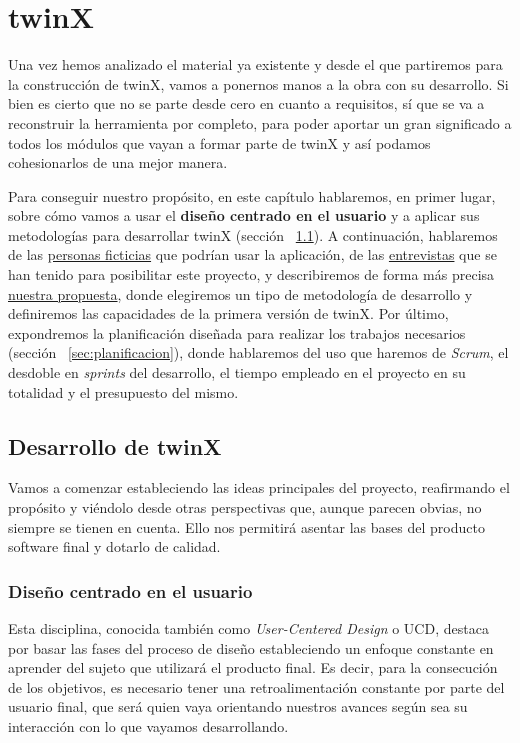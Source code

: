 \chapter{twinX}

Una vez hemos analizado el material ya existente y desde el que partiremos para la construcción de twinX, vamos a ponernos manos a la obra con su desarrollo. Si bien es cierto que no se parte desde cero en cuanto a requisitos, sí que se va a reconstruir la herramienta por completo, para poder aportar un gran significado a todos los módulos que vayan a formar parte de twinX y así podamos cohesionarlos de una mejor manera.
	
Para conseguir nuestro propósito, en este capítulo hablaremos, en primer lugar, sobre cómo vamos a usar el \textbf{diseño centrado en el usuario} y a aplicar sus metodologías para desarrollar twinX (sección ~\ref{sec:desarrollo}). A continuación, hablaremos de las \hyperref[sec:personas]{personas ficticias} que podrían usar la aplicación, de las \hyperref[sec:entrevistas]{entrevistas} que se han tenido para posibilitar este proyecto, y describiremos de forma más precisa \hyperref[sec:propuesta]{nuestra propuesta}, donde elegiremos un tipo de metodología de desarrollo y definiremos las capacidades de la primera versión de twinX. Por último, expondremos la planificación diseñada para realizar los trabajos necesarios (sección ~\ref{sec:planificacion}), donde hablaremos del uso que haremos de \textit{Scrum}, el desdoble en \textit{sprints} del desarrollo, el tiempo empleado en el proyecto en su totalidad y el presupuesto del mismo.

\section{Desarrollo de twinX}
\label{sec:desarrollo}
Vamos a comenzar estableciendo las ideas principales del proyecto, reafirmando el propósito y viéndolo desde otras perspectivas que, aunque parecen obvias, no siempre se tienen en cuenta. Ello nos permitirá asentar las bases del producto software final y dotarlo de calidad. 

\subsection{Diseño centrado en el usuario}

Esta disciplina, conocida también como \textit{User-Centered Design} o UCD, destaca por basar las fases del proceso de diseño estableciendo un enfoque constante en aprender del sujeto que utilizará el producto final. Es decir, para la consecución de los objetivos, es necesario tener una retroalimentación constante por parte del usuario final, que será quien vaya orientando nuestros avances según sea su interacción con lo que vayamos desarrollando.

